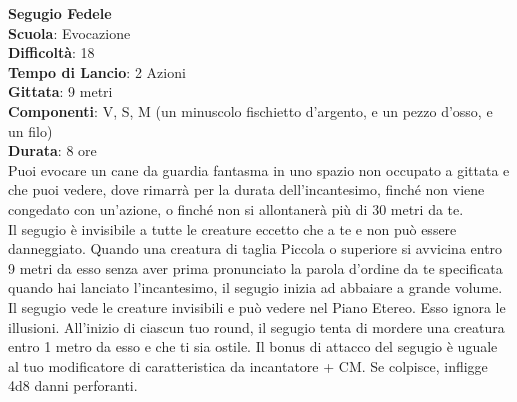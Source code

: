 \begin{multicols}{2}
\medskip\textbf{Segugio Fedele}\\
\textbf{Scuola}: Evocazione\\
\textbf{Difficoltà}:  18\\
\textbf{Tempo di Lancio}: 2 Azioni\\
\textbf{Gittata}: 9 metri\\
\textbf{Componenti}: V, S, M (un minuscolo fischietto d’argento, e un pezzo d’osso, e un filo)\\
\textbf{Durata}: 8 ore\\
Puoi evocare un cane da guardia fantasma in uno spazio non occupato a gittata e che puoi vedere, dove rimarrà per la durata dell'incantesimo, finché non viene congedato con un'azione, o finché non si allontanerà più di 30 metri da te.\\
Il segugio è invisibile a tutte le creature eccetto che a te e non può essere danneggiato. Quando una creatura di taglia Piccola o superiore si avvicina entro 9 metri da esso senza aver prima pronunciato la parola d’ordine da te specificata quando hai lanciato l'incantesimo, il segugio inizia ad abbaiare a grande volume. Il segugio vede le creature invisibili e può vedere nel Piano Etereo. Esso ignora le illusioni. All'inizio di ciascun tuo round, il segugio tenta di mordere una creatura entro 1 metro da esso e che ti sia ostile. Il bonus di attacco del segugio è uguale al tuo modificatore di caratteristica da incantatore + CM. Se colpisce, infligge 4d8 danni perforanti.


\end{multicols}

